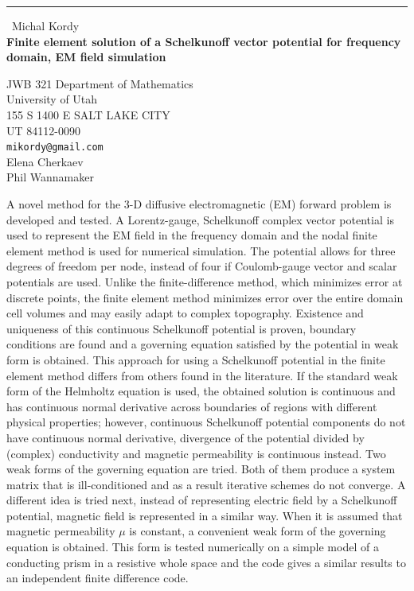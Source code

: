 \documentclass{report}
\begin{document}
\begin{center}
\rule{6in}{1pt} \
{\large Michal Kordy \\
{\bf Finite element solution of a Schelkunoff vector potential for frequency domain, EM field simulation}}

JWB 321 Department of Mathematics \\ University of Utah \\ 155 S 1400 E SALT LAKE CITY \\ UT 84112-0090
\\
{\tt mikordy@gmail.com}\\
Elena Cherkaev\\
Phil Wannamaker\end{center}

A novel method for the 3-D diffusive electromagnetic (EM) forward problem
is developed and tested. A Lorentz-gauge, Schelkunoff complex vector
potential is used to represent the EM field in the frequency domain and
the nodal finite element method is used for numerical simulation. The
potential allows for three degrees of freedom per node, instead of four
if Coulomb-gauge vector and scalar potentials are used. Unlike the
finite-difference method, which minimizes error at discrete points, the
finite element method minimizes error over the entire domain cell volumes
and may easily adapt to complex topography. Existence and uniqueness of
this continuous Schelkunoff potential is proven, boundary conditions are
found and a governing equation satisfied by the potential in weak form is
obtained. This approach for using a Schelkunoff potential in the finite
element method differs from others found in the literature. If the
standard weak form of the Helmholtz equation is used, the obtained
solution is continuous and has continuous normal derivative across
boundaries of regions with different physical properties; however,
continuous Schelkunoff potential components do not have continuous normal
derivative, divergence of the potential divided by (complex) conductivity
and magnetic permeability is continuous instead. Two weak forms of the
governing equation are tried. Both of them produce a system matrix that
is ill-conditioned and as a result iterative schemes do not converge. A
different idea is tried next, instead of representing electric field by a
Schelkunoff potential, magnetic field is represented in a similar way.
When it is assumed that magnetic permeability $\mu$ is constant, a
convenient weak form of the governing equation is obtained. This form is
tested numerically on a simple model of a conducting prism in a resistive
whole space and the code gives a similar results to an independent finite
difference code.
\end{document}

